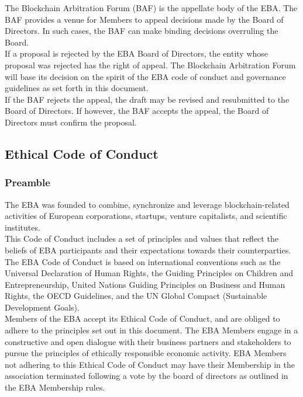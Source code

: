 \documentclass{article}
\begin{document}
The Blockchain Arbitration Forum (BAF) is the appellate body of the EBA. The BAF provides a venue for Members to appeal decisions made by the  Board of Directors. 
In such cases, the BAF can make binding decisions overruling the Board. \\
If a proposal is rejected by the EBA Board of Directors, the entity whose proposal was rejected has the right of appeal. 
The Blockchain Arbitration Forum will base its decision on the spirit of the EBA code of conduct and governance guidelines as set forth in this document. \\
If the BAF rejects the appeal, the draft may be revised and resubmitted to the Board of Directors. 
If however, the BAF accepts the appeal, the Board of Directors must confirm the proposal.

\subsection{Ethical Code of Conduct}

\subsubsection{Preamble}

The EBA was founded to combine, synchronize and leverage blockchain-related activities of European corporations, startups, venture capitalists, and scientific institutes. \\
This Code of Conduct includes a set of principles and values that reflect the beliefs of EBA participants and their expectations towards their counterparties. \\
The EBA Code of Conduct is based on international conventions such as the Universal Declaration of Human Rights, the Guiding Principles on Children and Entrepreneurship, United Nations Guiding Principles on Business and Human Rights, the OECD Guidelines, and the UN Global Compact (Sustainable Development Goals). \\
Members of the EBA accept its Ethical Code of Conduct, and are obliged to adhere to the principles set out in this document. 
The EBA Members engage in a constructive and open dialogue with their business partners and stakeholders to pursue the principles of ethically responsible economic activity.
EBA Members not adhering to this Ethical Code of Conduct may have their Membership in the association terminated following a vote by the board of directors as outlined in the EBA Membership rules.
\end{document}

